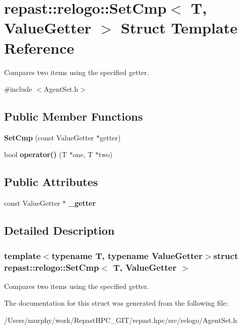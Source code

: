 \hypertarget{structrepast_1_1relogo_1_1_set_cmp}{\section{repast\-:\-:relogo\-:\-:Set\-Cmp$<$ T, Value\-Getter $>$ Struct Template Reference}
\label{structrepast_1_1relogo_1_1_set_cmp}
}


Compares two items using the specified getter.  




{\ttfamily \#include $<$Agent\-Set.\-h$>$}

\subsection*{Public Member Functions}
\begin{DoxyCompactItemize}
\item 
\hypertarget{structrepast_1_1relogo_1_1_set_cmp_a43b579d59a9292f40fd24672090fca75}{{\bfseries Set\-Cmp} (const Value\-Getter $\ast$getter)}\label{structrepast_1_1relogo_1_1_set_cmp_a43b579d59a9292f40fd24672090fca75}

\item 
\hypertarget{structrepast_1_1relogo_1_1_set_cmp_a460d264b98975b66038a7cc0eead34a9}{bool {\bfseries operator()} (T $\ast$one, T $\ast$two)}\label{structrepast_1_1relogo_1_1_set_cmp_a460d264b98975b66038a7cc0eead34a9}

\end{DoxyCompactItemize}
\subsection*{Public Attributes}
\begin{DoxyCompactItemize}
\item 
\hypertarget{structrepast_1_1relogo_1_1_set_cmp_a26d5897fee7b4dee6f8735649cb4be23}{const Value\-Getter $\ast$ {\bfseries \-\_\-getter}}\label{structrepast_1_1relogo_1_1_set_cmp_a26d5897fee7b4dee6f8735649cb4be23}

\end{DoxyCompactItemize}


\subsection{Detailed Description}
\subsubsection*{template$<$typename T, typename Value\-Getter$>$struct repast\-::relogo\-::\-Set\-Cmp$<$ T, Value\-Getter $>$}

Compares two items using the specified getter. 

The documentation for this struct was generated from the following file\-:\begin{DoxyCompactItemize}
\item 
/\-Users/murphy/work/\-Repast\-H\-P\-C\-\_\-\-G\-I\-T/repast.\-hpc/src/relogo/Agent\-Set.\-h\end{DoxyCompactItemize}
